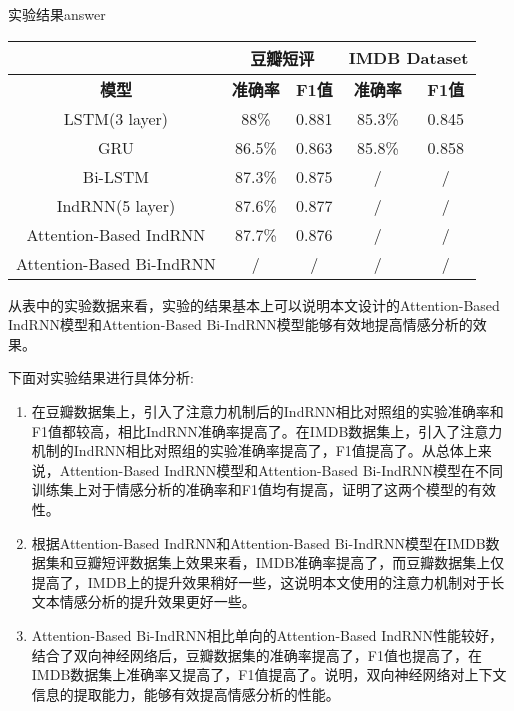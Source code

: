 \documentclass[a4paper,AutoFakeBold,oneside,12pt]{book}
\begin{document}
\begin{bupttable}{实验结果}{answer}
    \begin{tabular}{c|c c | c c}
         & \multicolumn{2}{|c|}{豆瓣短评}& \multicolumn{2}{c}{IMDB Dataset} \\
		\hline \textbf{模型} & \textbf{准确率} & \textbf{F1值} & \textbf{准确率} & \textbf{F1值} \\ \hline
		LSTM(3 layer) & 88\% & 0.881 &   85.3\%     &  0.845       \\
		 GRU & 86.5\% & 0.863 & 85.8\% & 0.858 \\
		 Bi-LSTM & 87.3\%  & 0.875 & / & / \\
         IndRNN(5 layer) & 87.6\% & 0.877  &  / & / \\
         Attention-Based IndRNN & 87.7\% & 0.876 &  / & / \\
         Attention-Based Bi-IndRNN & / & / & / & / \\
		\hline
    \end{tabular}
\end{bupttable}



从表中的实验数据来看，实验的结果基本上可以说明本文设计的Attention-Based IndRNN模型和Attention-Based Bi-IndRNN模型能够有效地提高情感分析的效果。

下面对实验结果进行具体分析:

\begin{enumerate}
    \item 在豆瓣数据集上，引入了注意力机制后的IndRNN相比对照组的实验准确率和F1值都较高，相比IndRNN准确率提高了。在IMDB数据集上，引入了注意力机制的IndRNN相比对照组的实验准确率提高了，F1值提高了。从总体上来说，Attention-Based IndRNN模型和Attention-Based Bi-IndRNN模型在不同训练集上对于情感分析的准确率和F1值均有提高，证明了这两个模型的有效性。
    \item 根据Attention-Based IndRNN和Attention-Based Bi-IndRNN模型在IMDB数据集和豆瓣短评数据集上效果来看，IMDB准确率提高了，而豆瓣数据集上仅提高了，IMDB上的提升效果稍好一些，这说明本文使用的注意力机制对于长文本情感分析的提升效果更好一些。
    \item Attention-Based Bi-IndRNN相比单向的Attention-Based IndRNN性能较好，结合了双向神经网络后，豆瓣数据集的准确率提高了，F1值也提高了，在IMDB数据集上准确率又提高了，F1值提高了。说明，双向神经网络对上下文信息的提取能力，能够有效提高情感分析的性能。
\end{enumerate}
\end{document}
